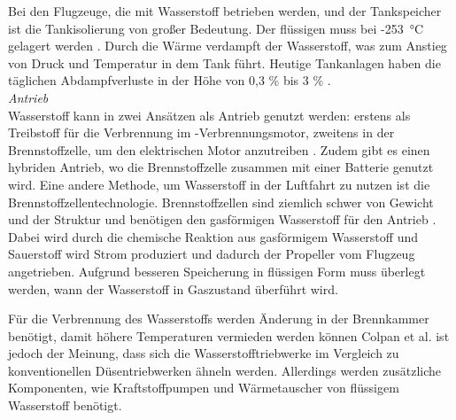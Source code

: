Bei den Flugzeuge, die mit Wasserstoff betrieben werden, und der Tankspeicher ist die Tankisolierung von großer Bedeutung. 
Der flüssigen  muss bei -253 °C gelagert werden \cite{colpan2022fuel}. 
Durch die Wärme verdampft der Wasserstoff, was zum Anstieg von Druck und Temperatur in dem Tank führt. Heutige Tankanlagen 
haben die täglichen Abdampfverluste in der Höhe von 0,3 \% bis 3 \% \cite{eichlseder2012hydrogen}.\\
%
%
%
\textit{Antrieb}\\
Wasserstoff kann in zwei Ansätzen als Antrieb genutzt werden: 
erstens als Treibstoff für die Verbrennung im -Verbrennungsmotor,
zweitens in der Brennstoffzelle, um den elektrischen Motor anzutreiben \cite{sky2020hydrogen}. 
Zudem gibt es einen hybriden Antrieb, wo die Brennstoffzelle zusammen mit einer Batterie genutzt wird.
%
Eine andere Methode, um Wasserstoff in der Luftfahrt zu nutzen ist die Brennstoffzellentechnologie.
Brennstoffzellen sind ziemlich schwer von Gewicht und der Struktur \cite{hepperle2012electric} und 
benötigen den gasförmigen Wasserstoff für den Antrieb \cite{colpan2022fuel}.
Dabei wird durch die chemische Reaktion aus gasförmigem Wasserstoff  und Sauerstoff  wird Strom produziert \cite{dalmia2022powering} und 
dadurch der Propeller vom Flugzeug angetrieben. Aufgrund besseren Speicherung in flüssigen Form muss überlegt werden, wann der Wasserstoff in Gaszustand überführt wird. 
%
%

Für die Verbrennung des Wasserstoffs werden Änderung in der Brennkammer benötigt, damit höhere Temperaturen vermieden werden können \cite{khandelwal2013hydrogen}
Colpan et al. \cite{colpan2022fuel} ist jedoch der Meinung, dass sich die Wasserstofftriebwerke im Vergleich zu konventionellen Düsentriebwerken ähneln werden. 
Allerdings werden zusätzliche Komponenten, wie Kraftstoffpumpen und Wärmetauscher von flüssigem Wasserstoff benötigt.


